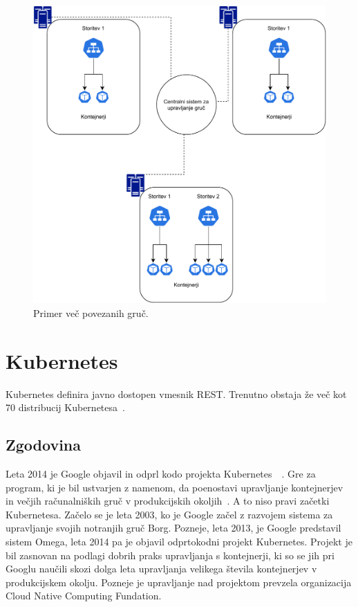 \documentclass[a4paper, 12pt]{book}
\begin{document}
\begin{figure}[h]
\begin{center}
\includegraphics[width=1.0\textwidth]{images/primer-povezanih-gruc.pdf}
\end{center}
\caption{Primer več povezanih gruč.}
\label{problem-povezanih-gruc}
\end{figure}

\chapter{Kubernetes}
\label{Kubernetes}
Kubernetes definira javno dostopen vmesnik REST.
Trenutno obstaja že več kot 70 distribucij Kubernetesa~\cite{cncf}.
\section{Zgodovina}
Leta 2014 je Google objavil in odprl kodo projekta Kubernetes~\cite{mastering-kubernetes}~\cite{borg-omega-kubernetes}.
Gre za program, ki je bil ustvarjen z namenom, da poenostavi upravljanje kontejnerjev in večjih računalniških gruč v produkcijskih okoljih~\cite{what-is-Kubernetes}.
A to niso pravi začetki Kubernetesa.
Začelo se je leta 2003, ko je Google začel z razvojem sistema za upravljanje svojih notranjih gruč Borg.
Pozneje, leta 2013, je Google predstavil sistem Omega, leta 2014 pa je objavil odprtokodni projekt Kubernetes. 
Projekt je bil zasnovan na podlagi dobrih praks upravljanja s kontejnerji, ki so se jih pri Googlu naučili skozi dolga leta upravljanja velikega števila kontejnerjev v produkcijskem okolju.
Pozneje je upravljanje nad projektom prevzela organizacija Cloud Native Computing Fundation.
\end{document}
